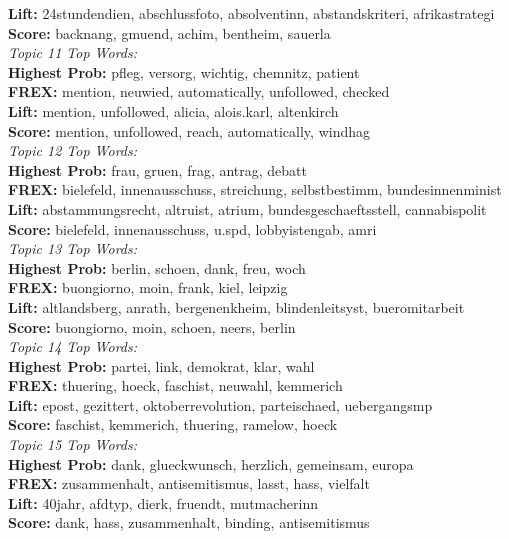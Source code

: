  	 \textbf{Lift:} 24stundendien, abschlussfoto, absolventinn, abstandskriteri, afrikastrategi \\
 	 \textbf{Score:} backnang, gmuend, achim, bentheim, sauerla \\
\textit{Topic 11 Top Words:}\\
 	 \textbf{Highest Prob:} pfleg, versorg, wichtig, chemnitz, patient \\
 	 \textbf{FREX:} mention, neuwied, automatically, unfollowed, checked \\
 	 \textbf{Lift:} mention, unfollowed, alicia, alois.karl, altenkirch \\
 	 \textbf{Score:} mention, unfollowed, reach, automatically, windhag \\
\textit{Topic 12 Top Words:}\\
 	 \textbf{Highest Prob:} frau, gruen, frag, antrag, debatt \\
 	 \textbf{FREX:} bielefeld, innenausschuss, streichung, selbstbestimm, bundesinnenminist \\
 	 \textbf{Lift:} abstammungsrecht, altruist, atrium, bundesgeschaeftsstell, cannabispolit \\
 	 \textbf{Score:} bielefeld, innenausschuss, u.spd, lobbyistengab, amri \\
\textit{Topic 13 Top Words:}\\
 	 \textbf{Highest Prob:} berlin, schoen, dank, freu, woch \\
 	 \textbf{FREX:} buongiorno, moin, frank, kiel, leipzig \\
 	 \textbf{Lift:} altlandsberg, anrath, bergenenkheim, blindenleitsyst, bueromitarbeit \\
 	 \textbf{Score:} buongiorno, moin, schoen, neers, berlin \\
\textit{Topic 14 Top Words:}\\
 	 \textbf{Highest Prob:} partei, link, demokrat, klar, wahl \\
 	 \textbf{FREX:} thuering, hoeck, faschist, neuwahl, kemmerich \\
 	 \textbf{Lift:} epost, gezittert, oktoberrevolution, parteischaed, uebergangsmp \\
 	 \textbf{Score:} faschist, kemmerich, thuering, ramelow, hoeck \\
\textit{Topic 15 Top Words:}\\
 	 \textbf{Highest Prob:} dank, glueckwunsch, herzlich, gemeinsam, europa \\
 	 \textbf{FREX:} zusammenhalt, antisemitismus, lasst, hass, vielfalt \\
 	 \textbf{Lift:} 40jahr, afdtyp, dierk, fruendt, mutmacherinn \\
 	 \textbf{Score:} dank, hass, zusammenhalt, binding, antisemitismus \\


